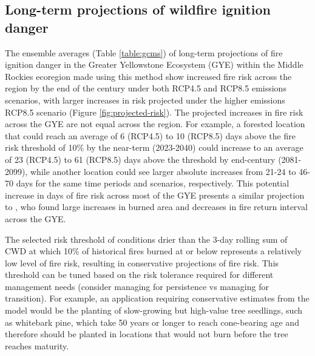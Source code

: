 \documentclass[11p]{article}
\begin{document}
\subsection{Long-term projections of wildfire ignition danger}

The ensemble averages (Table \ref{table:gcms}) of long-term projections of fire ignition danger in the Greater Yellowstone Ecosystem (GYE) within the Middle Rockies ecoregion made using this method show increased fire risk across the region by the end of the century under both RCP4.5 and RCP8.5 emissions scenarios, with larger increases in risk projected under the higher emissions RCP8.5 scenario (Figure \ref{fig:projected-risk}). The projected increases in fire risk across the GYE are not equal across the region.  For example, a forested location that could reach an average of 6 (RCP4.5) to 10 (RCP8.5) days above the fire risk threshold of 10\% by the near-term (2023-2040) could increase to an average of 23 (RCP4.5) to 61 (RCP8.5) days above the threshold by end-century (2081-2099), while another location could see larger absolute increases from 21-24 to 46-70 days for the same time periods and scenarios, respectively.  This potential increase in days of fire risk across most of the GYE presents a similar projection to \citet{westerlingContinuedWarmingCould2011}, who found large increases in burned area and decreases in fire return interval across the GYE.  

The selected risk threshold of conditions drier than the 3-day rolling sum of CWD at which 10\% of historical fires burned at or below represents a relatively low level of fire risk, resulting in conservative projections of fire risk.  This threshold can be tuned based on the risk tolerance required for different management needs (consider managing for persistence vs managing for transition).  For example, an application requiring conservative estimates from the model would be the planting of slow-growing but high-value tree seedlings, such as whitebark pine, which take 50 years or longer to reach cone-bearing age \citep{tombackWhitebarkPineCommunities2001} and therefore should be planted in locations that would not burn before the tree reaches maturity.
\end{document}
